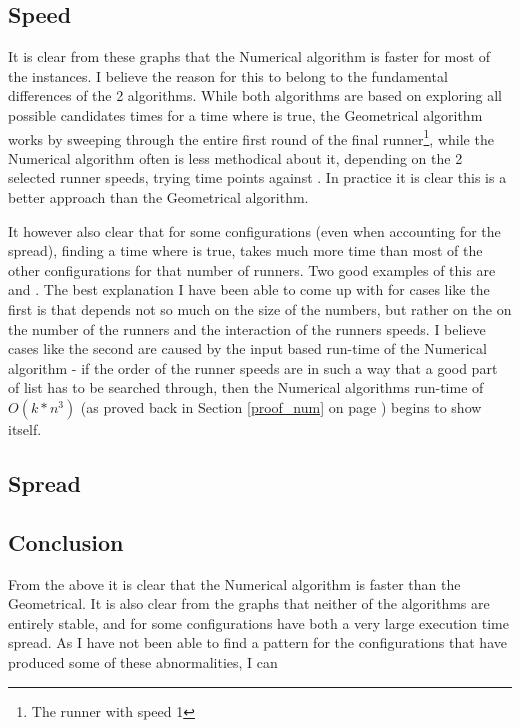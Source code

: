\subsection{Speed}

It is clear from these graphs that the Numerical algorithm is faster for most of the instances. 
I believe the reason for this to belong to the fundamental differences of the 2 algorithms. While both algorithms are based on exploring all possible candidates times for a time where  is true, the Geometrical algorithm works by sweeping through the entire first round of the final runner\footnote{The runner with speed 1}, while the Numerical algorithm often is less methodical about it, depending on the 2 selected runner speeds, trying time points against . In practice it is clear this is a better approach than the Geometrical algorithm.
 
It however also clear that for some configurations (even when accounting for the spread), finding a time where  is true, takes much more time than most of the other configurations for that number of runners. Two good examples of this are  and . The best explanation I have been able to come up with for cases like the first is that  depends not so much on the size of the numbers, but rather on the on the number of the runners and the interaction of the runners speeds. I believe cases like the second are caused by the input based run-time of the Numerical algorithm - if the order of the runner speeds are in such a way that a good part of list has to be searched through, then the Numerical algorithms run-time of $O(k * n^3)$ (as proved back in Section \ref{proof_num} on page \pageref{proof_num}) begins to show itself.  

\subsection{Spread}




\subsection{Conclusion}

From the above it is clear that the Numerical algorithm is faster than the Geometrical. It is also clear from the graphs that neither of the algorithms are entirely stable, and for some configurations have both a very large execution time spread. As I have not been able to find a pattern for the configurations that have produced some of these abnormalities, I can 
